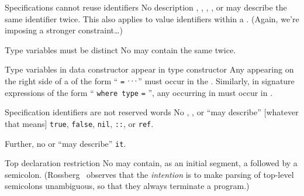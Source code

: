 \begin{clause}{Specifications cannot reuse identifiers}
No description , ,
, , or 
may describe the same identifier twice. This also applies to value
identifiers within a . (Again, we're imposing a
stronger constraint\dots)
\end{clause}

\begin{clause}{Type variables must be distinct}
No  may contain the same  twice.
\end{clause}

\begin{clause}{Type variables in data constructor appear in type constructor}
Any  appearing on the right side of a
 of the form ``
 \texttt{=} $\mathinner{{}^{\textstyle .\,.\,.}}$'' must occur in the
. Similarly, in signature expressions of the form
`` \texttt{where type} 
 \texttt{=} '', any
 occurring in  must occur in . 
\end{clause}

\begin{clause}{Specification identifiers are not reserved words}
No , , or 
``may describe'' [whatever that means] \texttt{true}, \texttt{false},
\texttt{nil}, \texttt{::}, or \texttt{ref}.

Further, no  or  ``may describe''
\texttt{it}. 
\end{clause}

\begin{comment}{Constraining our deviation}
So our deviation~\zref{deviation:no-redefinitions} from the ``full''
language imposed the constraint that redefinitions are illegal, but we
can ``shadow'' an identifier if it is inside a structure. We see
that the Definition further limits the possible identifiers we can
shadow \emph{in general}.
\end{comment}

\begin{clause}{Top declaration restriction}\label{clause:syntax-modules:top-declaration-restriction}
No  may contain, as an initial segment, a
 followed by a semicolon.
(Rossberg~\cite{rossberg2018defects} observes that the \emph{intention}
is to make parsing of top-level semicolons unambiguous, so that they
always terminate a program.)
\end{clause}

